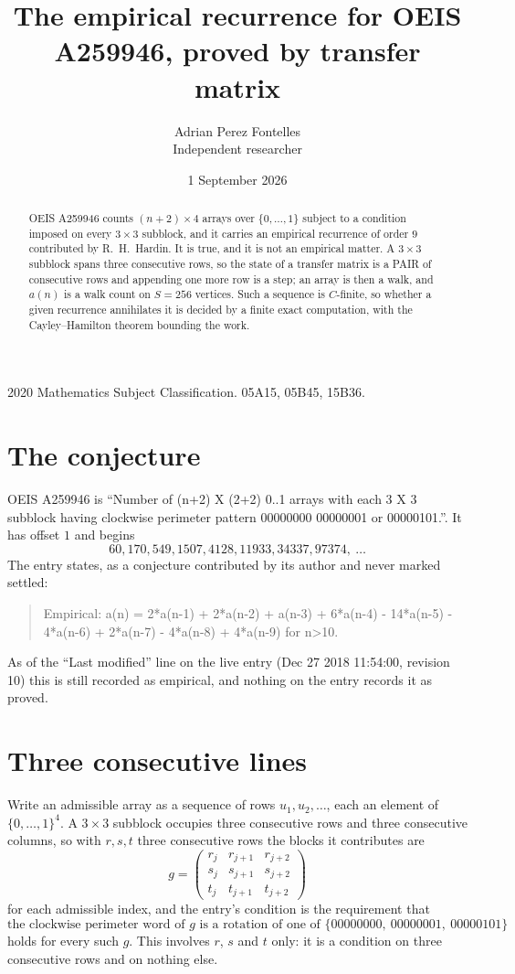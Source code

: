 \documentclass[11pt,a4paper]{article}
\title{The empirical recurrence for OEIS A259946, proved by transfer matrix}
\author{Adrian Perez Fontelles\\ \small Independent researcher}
\date{1 September 2026}
\theoremstyle{plain}
\theoremstyle{definition}
\begin{document}
\maketitle

\begin{abstract}
OEIS A259946 counts $(n+2)\times4$ arrays over $\{0,\dots,1\}$ subject to a condition imposed on
every $3\times3$ subblock, and it carries an empirical recurrence of order $9$
contributed by R.~H.~Hardin. It is true, and it is not an empirical matter. A $3\times3$
subblock spans three consecutive rows, so the state of a transfer matrix is a PAIR of
consecutive rows and appending one more row is a step; an array is then a walk, and
$a(n)$ is a walk count on $S=256$ vertices. Such a sequence is $C$-finite, so whether a given
recurrence annihilates it is decided by a finite exact computation, with the Cayley--Hamilton
theorem bounding the work.
\end{abstract}

\noindent\small 2020 Mathematics Subject Classification. 05A15, 05B45, 15B36.\normalsize

\section{The conjecture}

OEIS A259946 is ``Number of (n+2) X (2+2) 0..1 arrays with each 3 X 3 subblock having clockwise perimeter pattern 00000000 00000001 or 00000101.''. It has offset $1$ and begins
\[
60, 170, 549, 1507, 4128, 11933, 34337, 97374,\ \dots
\]
The entry states, as a conjecture contributed by its author and never marked settled:
\begin{quote}
Empirical: a(n) = 2*a(n-1) + 2*a(n-2) + a(n-3) + 6*a(n-4) - 14*a(n-5) - 4*a(n-6) + 2*a(n-7) - 4*a(n-8) + 4*a(n-9) for n>10.
\end{quote}
As of the ``Last modified'' line on the live entry (Dec 27 2018 11:54:00, revision 10) this is still
recorded as empirical, and nothing on the entry records it as proved.

\section{Three consecutive lines}

Write an admissible array as a sequence of rows $u_1,u_2,\dots$, each an element of
$\{0,\dots,1\}^{4}$. A $3\times3$ subblock occupies three consecutive rows and
three consecutive columns, so with $r,s,t$ three consecutive rows the blocks it
contributes are
\[
g=\begin{pmatrix}r_j&r_{j+1}&r_{j+2}\\ s_j&s_{j+1}&s_{j+2}\\ t_j&t_{j+1}&t_{j+2}\end{pmatrix}
\]
for each admissible index, and the entry's condition is the requirement that
\[
\text{the clockwise perimeter word of }g\text{ is a rotation of one of }\{00000000,\ 00000001,\ 00000101\}
\]
holds for every such $g$. This involves $r$, $s$ and $t$ only: it is a condition on
three consecutive rows and on nothing else.
\end{document}
